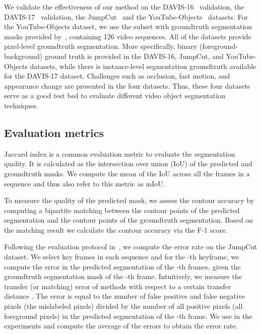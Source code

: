 We validate the effectiveness of our method on the DAVIS-16~\cite{PerazziCVPR16} validation, the DAVIS-17~\cite{pont2017DAVIS} validation, the JumpCut~\cite{FanTOG15} and the YouTube-Objects~\cite{PrestCVPR12} datasets. For the YouTube-Objects dataset, we use the subset with groundtruth segmentation masks provided by~\cite{JainECCV2014}, containing 126 video sequences. All of the datasets provide pixel-level groundtruth segmentation. More specifically, binary (foreground-background) ground truth is provided in the DAVIS-16, JumpCut, and YouTube-Objects datasets, while there is instance-level segmentation groundtruth available for the DAVIS-17 dataset. Challenges such as occlusion, fast motion, and appearance change are presented in the four datasets. Thus, these four datasets serve as a good test bed to evaluate different video object segmentation techniques.



\subsection{Evaluation metrics}

 Jaccard index is a common evaluation metric to evaluate the segmentation quality. It is calculated as the intersection over union (IoU) of the predicted and groundtruth masks. We compute the mean of the IoU across all the frames in a sequence and thus also refer to this metric as mIoU.

 To measure the quality of the predicted mask, we assess the contour accuracy by computing a bipartite matching between the contour points of the predicted segmentation and the contour points of the groundtruth segmentation. Based on the matching result we calculate the contour accuracy via the F-1 score. 


 Following the evaluation protocol in~\cite{FanTOG15}, we compute the error rate on the JumpCut dataset. We select key frames  in each sequence and for the -th keyframe, we compute the error in the predicted segmentation of the -th frames, given the groundtruth segmentation mask of the -th frame. Intuitively, we measure the transfer (or matching) error of methods with respect to a certain transfer distance . The error is equal to the number of false positive and false negative pixels (the mislabeled pixels) divided by the number of all positive pixels (all foreground pixels) in the predicted segmentation of the -th frame. We use  in the experiments and compute the average of the errors to obtain the error rate.

